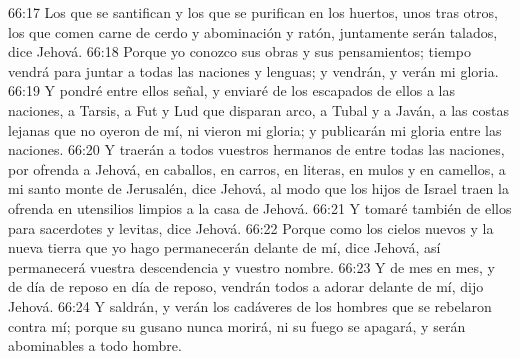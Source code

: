 66:17 Los que se santifican y los que se purifican en los huertos, unos tras otros, los que comen carne de cerdo y abominación y ratón, juntamente serán talados, dice Jehová.  
66:18 Porque yo conozco sus obras y sus pensamientos; tiempo vendrá para juntar a todas las naciones y lenguas; y vendrán, y verán mi gloria.  
66:19 Y pondré entre ellos señal, y enviaré de los escapados de ellos a las naciones, a Tarsis, a Fut y Lud que disparan arco, a Tubal y a Javán, a las costas lejanas que no oyeron de mí, ni vieron mi gloria; y publicarán mi gloria entre las naciones.  
66:20 Y traerán a todos vuestros hermanos de entre todas las naciones, por ofrenda a Jehová, en caballos, en carros, en literas, en mulos y en camellos, a mi santo monte de Jerusalén, dice Jehová, al modo que los hijos de Israel traen la ofrenda en utensilios limpios a la casa de Jehová.  
66:21 Y tomaré también de ellos para sacerdotes y levitas, dice Jehová.  
66:22 Porque como los cielos nuevos y la nueva tierra que yo hago permanecerán delante de mí, dice Jehová, así permanecerá vuestra descendencia y vuestro nombre.  
66:23 Y de mes en mes, y de día de reposo en día de reposo, vendrán todos a adorar delante de mí, dijo Jehová.  
66:24 Y saldrán, y verán los cadáveres de los hombres que se rebelaron contra mí; porque su gusano nunca morirá, ni su fuego se apagará, y serán abominables a todo hombre. 

